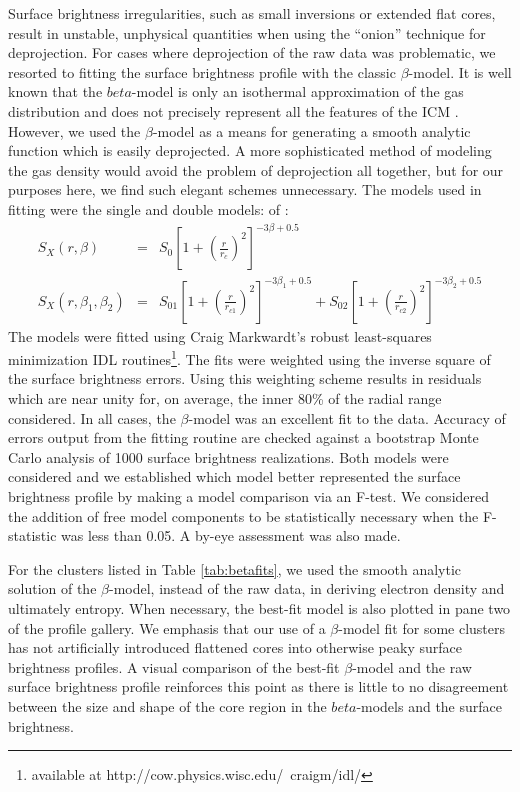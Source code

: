 \documentclass[12pt, preprint]{aastex}
\begin{document}
Surface brightness irregularities, such as small inversions or
extended flat cores, result in unstable, unphysical quantities when
using the ``onion'' technique for deprojection. For cases where
deprojection of the raw data was problematic, we resorted to fitting
the surface brightness profile with the classic $\beta$-model. It is
well known that the $beta$-model is only an isothermal approximation
of the gas distribution and does not precisely represent all the
features of the ICM
\citep{2000MNRAS.311..313E,2002ApJ...579..571L,2007ApJ...665..911H}.
However, we used the $\beta$-model as a means for generating a smooth
analytic function which is easily deprojected. A more sophisticated
method of modeling the gas density \cite{2005ApJ...628..655V} would
avoid the problem of deprojection all together, but for our purposes
here, we find such elegant schemes unnecessary. The models used in
fitting were the single and double models:
of \cite{1978A&A....70..677C}:
\begin{eqnarray}
S_X(r,\beta) &=& S_0 \left[1+\left(\frac{r}{r_c}\right)^2\right]^{-3\beta+0.5} \nonumber \\
S_X(r,\beta_1,\beta_2) &=& S_{01} \left[1+\left(\frac{r}{r_{c1}}\right)^2\right]^{-3\beta_1+0.5} + S_{02} \left[1+\left(\frac{r}{r_{c2}}\right)^2\right]^{-3\beta_2+0.5} \nonumber
\end{eqnarray}
The models were fitted using Craig Markwardt's robust least-squares
minimization IDL routines\footnote{available at
http://cow.physics.wisc.edu/~craigm/idl/}.  The fits were weighted
using the inverse square of the surface brightness errors. Using this
weighting scheme results in residuals which are near unity for, on
average, the inner 80\% of the radial range considered. In all cases, the
$\beta$-model was an excellent fit to the data. Accuracy of errors
output from the fitting routine are checked against a bootstrap Monte
Carlo analysis of 1000 surface brightness realizations. Both models
were considered and we established which model better represented the
surface brightness profile by making a model comparison via an
F-test. We considered the addition of free model components to be
statistically necessary when the F-statistic was less than 0.05. A
by-eye assessment was also made.

For the clusters listed in Table \ref{tab:betafits}, we used the
smooth analytic solution of the $\beta$-model, instead of the raw
data, in deriving electron density and ultimately entropy. When
necessary, the best-fit model is also plotted in pane two of the
profile gallery. We emphasis that our use of a $\beta$-model fit for
some clusters has not artificially introduced flattened cores into
otherwise peaky surface brightness profiles. A visual comparison of
the best-fit $\beta$-model and the raw surface brightness profile
reinforces this point as there is little to no disagreement between
the size and shape of the core region in the $beta$-models and the
surface brightness.
\end{document}
